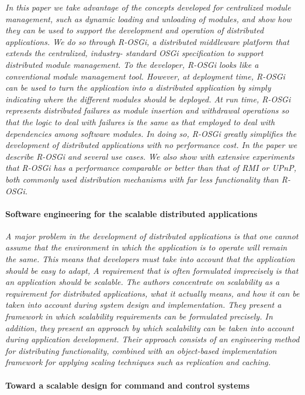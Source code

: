 \documentclass{article}
\begin{document}
\emph{In this paper we take advantage of the concepts developed for centralized
module management, such as dynamic loading and unloading of modules, and show
how they can be used to support the development and operation of distributed
applications. We do so through R-OSGi, a distributed middleware platform that
extends the centralized, industry- standard OSGi specification to support
distributed module management.  To the developer, R-OSGi looks like a
conventional module management tool. However, at deployment time, R-OSGi can be
used to turn the application into a distributed application by simply
indicating where the different modules should be deployed. At run time, R-OSGi
represents distributed failures as module insertion and withdrawal operations
so that the logic to deal with failures is the same as that employed to deal
with dependencies among software modules. In doing so, R-OSGi greatly
simplifies the development of distributed applications with no performance
cost. In the paper we describe R-OSGi and several use cases.  We also show with
extensive experiments that R-OSGi has a performance comparable or better than
that of RMI or UPnP, both commonly used distribution mechanisms with far less
functionality than R-OSGi.}

\paragraph{Software engineering for the scalable distributed applications}
\cite{van1998software}

\emph{A major problem in the development of distributed applications is that
one cannot assume that the environment in which the application is to operate
will remain the same. This means that developers must take into account that
the application should be easy to adapt, A requirement that is often formulated
imprecisely is that an application should be scalable. The authors concentrate
on scalability as a requirement for distributed applications, what it actually
means, and how it can be taken into account during system design and
implementation. They present a framework in which scalability requirements can
be formulated precisely. In addition, they present an approach by which
scalability can be taken into account during application development. Their
approach consists of an engineering method for distributing functionality,
combined with an object-based implementation framework for applying scaling
techniques such as replication and caching.}

\paragraph{Toward a scalable design for command and control systems}
\cite{caruso1997toward}
\end{document}
